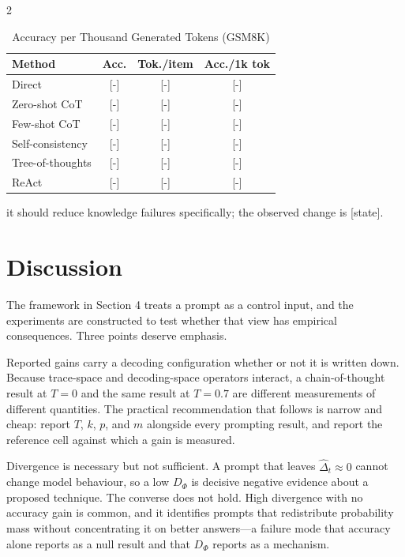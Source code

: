 \documentclass{article}
\begin{document}
\begin{multicols}{2}
\begin{table}[H]
\caption{Accuracy per Thousand Generated Tokens (GSM8K)}
\centering
\small
\begin{tabular}{lccc}
\toprule
\textbf{Method} & \textbf{Acc.} & \textbf{Tok./item} & \textbf{Acc./1k tok} \\
\midrule
Direct & \textcolor{BrickRed}{[-]} & \textcolor{BrickRed}{[-]} & \textcolor{BrickRed}{[-]} \\
Zero-shot CoT & \textcolor{BrickRed}{[-]} & \textcolor{BrickRed}{[-]} & \textcolor{BrickRed}{[-]} \\
Few-shot CoT & \textcolor{BrickRed}{[-]} & \textcolor{BrickRed}{[-]} & \textcolor{BrickRed}{[-]} \\
Self-consistency & \textcolor{BrickRed}{[-]} & \textcolor{BrickRed}{[-]} & \textcolor{BrickRed}{[-]} \\
Tree-of-thoughts & \textcolor{BrickRed}{[-]} & \textcolor{BrickRed}{[-]} & \textcolor{BrickRed}{[-]} \\
ReAct & \textcolor{BrickRed}{[-]} & \textcolor{BrickRed}{[-]} & \textcolor{BrickRed}{[-]} \\
\bottomrule
\end{tabular}
\end{table}

it should reduce knowledge failures specifically; the observed change is \textcolor{BrickRed}{[state]}.

\section{Discussion}

The framework in Section 4 treats a prompt as a control input, and the experiments are constructed to test whether that view has empirical consequences. Three points deserve emphasis.

Reported gains carry a decoding configuration whether or not it is written down. Because trace-space and decoding-space operators interact, a chain-of-thought result at $T = 0$ and the same result at $T = 0.7$ are different measurements of different quantities. The practical recommendation that follows is narrow and cheap: report $T$, $k$, $p$, and $m$ alongside every prompting result, and report the reference cell against which a gain is measured.

Divergence is necessary but not sufficient. A prompt that leaves $\hat{\Delta}_{t} \approx 0$ cannot change model behaviour, so a low $D_{\Phi}$ is decisive negative evidence about a proposed technique. The converse does not hold. High divergence with no accuracy gain is common, and it identifies prompts that redistribute probability mass without concentrating it on better answers---a failure mode that accuracy alone reports as a null result and that $D_{\Phi}$ reports as a mechanism.


\end{multicols}
\end{document}
